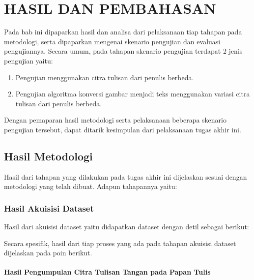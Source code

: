 \chapter{HASIL DAN PEMBAHASAN}
\label{chap:hasilpembahasan}


Pada bab ini dipaparkan hasil dan analisa dari pelaksanaan tiap tahapan pada metodologi, serta dipaparkan mengenai skenario pengujian dan evaluasi pengujiannya. Secara umum, pada tahapan skenario pengujian terdapat 2 jenis pengujian yaitu: \par

\begin{enumerate}[nolistsep]
  \item Pengujian menggunakan citra tulisan dari penulis berbeda.
  \item Pengujian algoritma konversi gambar menjadi teks menggunakan variasi citra tulisan dari penulis berbeda.
\end{enumerate}

Dengan pemaparan hasil metodologi serta pelaksanaan beberapa skenario pengujian tersebut, dapat ditarik kesimpulan dari pelaksanaan tugas akhir ini.\par


\section{Hasil Metodologi}
\label{sec:hasilmetodologi}

Hasil dari tahapan yang dilakukan pada tugas akhir ini dijelaskan sesuai dengan metodologi yang telah dibuat. Adapun tahapannya yaitu: \par

\subsection{Hasil Akuisisi Dataset}
\label{subsec:Hasilakuisisidataset}

\noindent Hasil dari akuisisi dataset yaitu didapatkan dataset dengan detil sebagai berikut: \par
Secara spesifik, hasil dari tiap proses yang ada pada tahapan akuisisi dataset dijelaskan pada poin berikut.

\subsubsection{Hasil Pengumpulan Citra Tulisan Tangan pada Papan Tulis}
\label{subsubsec:hasilpengumpulancitra}

